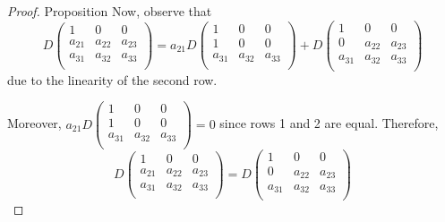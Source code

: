 \begin{proof} {Proposition}
    Now, observe that \[
        D\begin{pmatrix}
            1      & 0      & 0      \\
            a_{21} & a_{22} & a_{23} \\
            a_{31} & a_{32} & a_{33} \\
        \end{pmatrix}  = a_{21} D\begin{pmatrix}
            1      & 0      & 0      \\
            1      & 0      & 0      \\
            a_{31} & a_{32} & a_{33} \\
        \end{pmatrix} + D\begin{pmatrix}
            1      & 0      & 0      \\
            0      & a_{22} & a_{23} \\
            a_{31} & a_{32} & a_{33} \\
        \end{pmatrix}
    \]
    due to the linearity of the second row.

    Moreover, \(a_{21}D\begin{pmatrix}
        1      & 0      & 0      \\
        1      & 0      & 0      \\
        a_{31} & a_{32} & a_{33} \\
    \end{pmatrix} = 0\) since rows 1 and 2 are equal. Therefore,\[
        D\begin{pmatrix}
            1      & 0      & 0      \\
            a_{21} & a_{22} & a_{23} \\
            a_{31} & a_{32} & a_{33} \\
        \end{pmatrix}  =  D\begin{pmatrix}
            1      & 0      & 0      \\
            0      & a_{22} & a_{23} \\
            a_{31} & a_{32} & a_{33} \\
        \end{pmatrix}
    \]


\end{proof}
